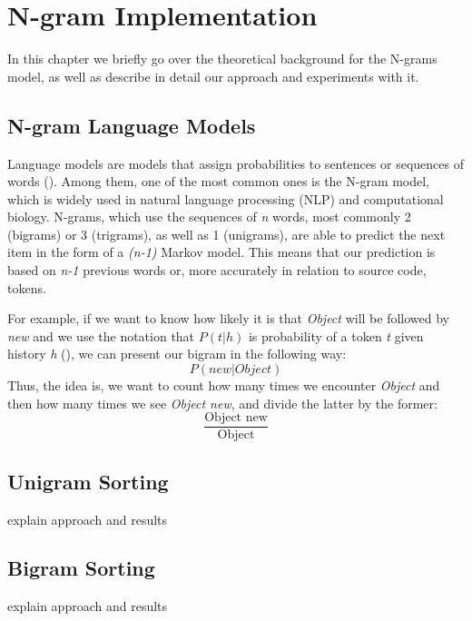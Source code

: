 \chapter{N-gram Implementation}
\label{chap:N-gram Implementation}

In this chapter we briefly go over the theoretical background for the N-grams
model, as well as describe in detail our approach and experiments with it.
\section{N-gram Language Models}
Language models are models that assign probabilities to sentences or sequences
of words (\cite{Jura09a}). Among them, one of the most common ones is the
N-gram model, which is widely used in natural language processing (NLP) and
computational biology. N-grams, which use the sequences of \textit{n} words,
most commonly 2 (bigrams) or 3 (trigrams), as well as 1 (unigrams), are able
to predict the next item in the form of a \textit{(n-1)} Markov model. This
means that our prediction is based on \textit{n-1} previous words or, more
accurately in relation to source code, tokens.

For example, if we want to know how likely it is that \textit{Object} will
be followed by \textit{new} and we use the notation that $P(t|h)$ is
probability of a token \textit{t} given history \textit{h} (\cite{Jura09a}),
we can present our bigram in the following way:
\begin{equation}
    P(new|Object)
\end{equation}
Thus, the idea is, we want to count how many times we encounter \textit{Object}
and then how many times we see \textit{Object new}, and divide the latter by
the former:
\begin{equation}
    \frac{\text{Object new}}{\text{Object}}
\end{equation}

\section{Unigram Sorting}
explain approach and results

\section{Bigram Sorting}
explain approach and results